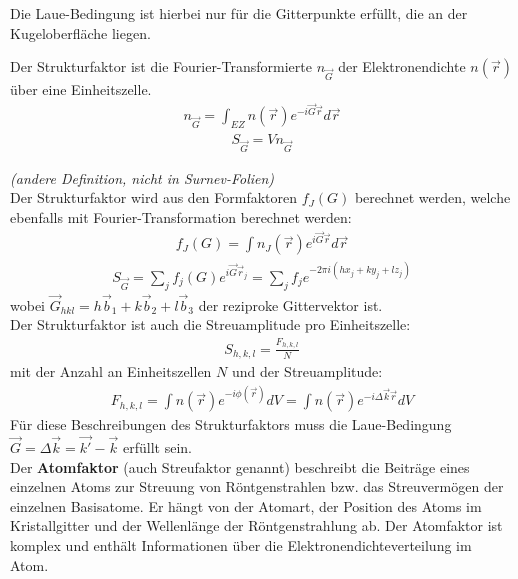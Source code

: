 Die Laue-Bedingung ist hierbei nur für die Gitterpunkte erfüllt, die an der Kugeloberfläche liegen. 


\label{q:27}

Der Strukturfaktor ist die Fourier-Transformierte $n_{\Vec{G}}$ der Elektronendichte $ n(\vec{r})$ über eine Einheitszelle. 
\begin{align}
n_{\vec{G}} = \int _{EZ} n(\vec{r}) e^{-i \vec{G} \vec{r}} d\vec{r} 
\end{align}
\begin{align}
S_{\vec{G}} = V n_{\vec{G}} 
\end{align} \medskip


\textit{(andere Definition, nicht in Surnev-Folien)} \\
Der Strukturfaktor wird aus den Formfaktoren $f_J(G)$ berechnet werden, welche ebenfalls mit Fourier-Transformation berechnet werden:
\begin{align}
f_J(G) = \int n_J(\vec{r}) e^{i \vec{G} \vec{r}} d\vec{r}
\end{align}
\begin{align}
S_{\vec{G}} = \sum_j f_j (G) e^{i \vec{G} \vec{r}_j} = \sum_j f_j e^{-2 \pi i (hx_j + ky_j + l z_j)}
\end{align}
wobei $\vec{G}_{hkl} = h\vec{b}_1+k\vec{b}_2+l\vec{b}_3$ der reziproke Gittervektor ist. \\




Der Strukturfaktor ist auch die Streuamplitude pro Einheitszelle:
\begin{align}
S_{h,k,l} = \frac{F_{h,k,l}}{N}
\end{align}
mit der Anzahl an Einheitszellen $N$ und der Streuamplitude:
\begin{align}
    F_{h,k,l} = \int n(\vec{r}) e^{-i \phi(\vec{r})} dV = \int n(\vec{r}) e^{-i \Delta \vec{k} \vec{r}} dV
\end{align}
Für diese Beschreibungen des Strukturfaktors muss die Laue-Bedingung $\vec{G} = \Delta \vec{k} = \vec{k'}-\vec{k}$ erfüllt sein. \bigskip \\

Der \textbf{Atomfaktor} (auch Streufaktor genannt) beschreibt die Beiträge eines einzelnen Atoms zur Streuung von Röntgenstrahlen bzw. das Streuvermögen der einzelnen Basisatome. Er hängt von der Atomart, der Position des Atoms im Kristallgitter und der Wellenlänge der Röntgenstrahlung ab. Der Atomfaktor ist komplex und enthält Informationen über die Elektronendichteverteilung im Atom.

